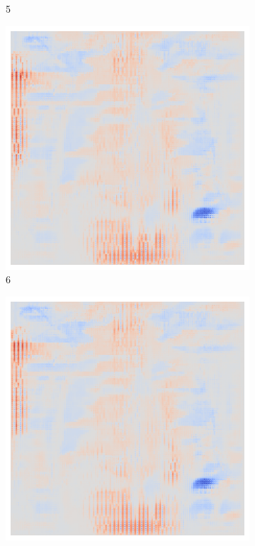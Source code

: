 \begin{figure}[ht!]
\begin{subfigure}{0.095\linewidth}
        \caption{5}
    \end{subfigure}\hfill%
    \begin{subfigure}{0.095\linewidth}
        \centering
        \includegraphics[height=1\linewidth]{01-images/05-resultate/uap_efficientnet/uap0-efficientnetv2m-covid-n200-robustificationslevel6.png}
        \caption{6}
    \end{subfigure}\hfill%
    \begin{subfigure}{0.095\linewidth}
        \centering
        \includegraphics[height=1\linewidth]{01-images/05-resultate/uap_efficientnet/uap0-efficientnetv2m-covid-n200-robustificationslevel7.png}

\end{subfigure}
\end{figure}
